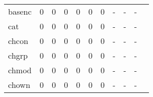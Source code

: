 \begin{longtable}{lp{1.2cm}p{1.2cm}p{1.2cm}p{1.2cm}p{1.2cm}p{1.2cm}p{1.2cm}p{1.2cm}p{1.2cm}p{1.2cm}}
basenc    &                                     0 &                                                  0 &                                                  0 &                                                  0 &                                                  0 &                                                  0 &                                                  - &                                                  - &                                                  - \\
cat       &                                     0 &                                                  0 &                                                  0 &                                                  0 &                                                  0 &                                                  0 &                                                  - &                                                  - &                                                  - \\
chcon     &                                     0 &                                                  0 &                                                  0 &                                                  0 &                                                  0 &                                                  0 &                                                  - &                                                  - &                                                  - \\
chgrp     &                                     0 &                                                  0 &                                                  0 &                                                  0 &                                                  0 &                                                  0 &                                                  - &                                                  - &                                                  - \\
chmod     &                                     0 &                                                  0 &                                                  0 &                                                  0 &                                                  0 &                                                  0 &                                                  - &                                                  - &                                                  - \\
chown     &                                     0 &                                                  0 &                                                  0 &                                                  0 &                                                  0 &                                                  0 &                                                  - &                                                  - &                                                  - \\

\end{longtable}
